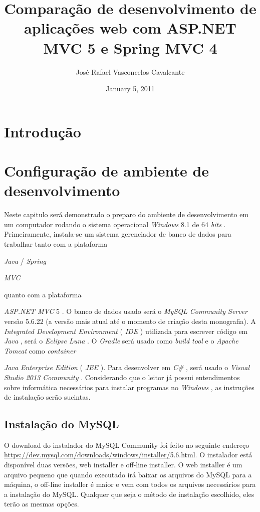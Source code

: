 \documentclass[a4paper,12pt]{article}
\newcommand{\anmvc} {
\sigla{ASP.NET MVC} 5
}
\newcommand{\spring} {
\lang{Java}/\est{Spring} \sigla{MVC}
}
\newcommand{\est}[1] {
	\textit{#1}
}
\newcommand{\sigla}[1] {
	\textit{#1}
}
\newcommand{\lang}[1] {
	\textit{#1}
}
\begin{document}
\title{Comparação de desenvolvimento de aplicações web com ASP.NET MVC 5 e Spring MVC 4}
\author{José Rafael Vasconcelos Cavalcante}
\date{January 5, 2011}
\maketitle

\newpage
\section{Introdução}

\newpage
\section{Configuração de ambiente de desenvolvimento}

Neste capitulo será demonstrado o preparo do ambiente de desenvolvimento em um computador rodando o sistema operacional \est{Windows} 8.1 de 64 \est{bits}. Primeiramente, instala-se um sistema gerenciador de banco de dados para trabalhar tanto com a plataforma \spring quanto com a plataforma \anmvc.  O banco de dados usado será o \est{MySQL Community Server} versão 5.6.22 (a versão mais atual até o momento de criação desta monografia). A \est{Integrated Development Environment} (\sigla{IDE}) utilizada  para escrever código em \lang{Java}, será o \est{Eclipse Luna}. O \est{Gradle} será usado como \est{build tool} e o \est{Apache Tomcat} como \est{container} \est{Java Enterprise Edition} (\sigla{JEE}). Para desenvolver em \lang{C\#}, será usado o \est{Visual Studio 2013 Community}. Considerando que o leitor já possui entendimentos sobre informática necessários para instalar programas no \est{Windows}, as instruções de instalação serão sucintas. 

\subsection{Instalação do MySQL}

O download do instalador do MySQL Community foi feito no seguinte endereço \url{https://dev.mysql.com/downloads/windows/installer/}5.6.html. O instalador está disponível duas versões, web installer e off-line installer. O web installer é um arquivo pequeno que quando executado irá baixar os arquivos do MySQL para a máquina, o off-line installer  é maior e vem com todos os arquivos necessários para a  instalação do MySQL. Qualquer que seja o método de instalação escolhido, eles terão as mesmas opções.
\end{document}
